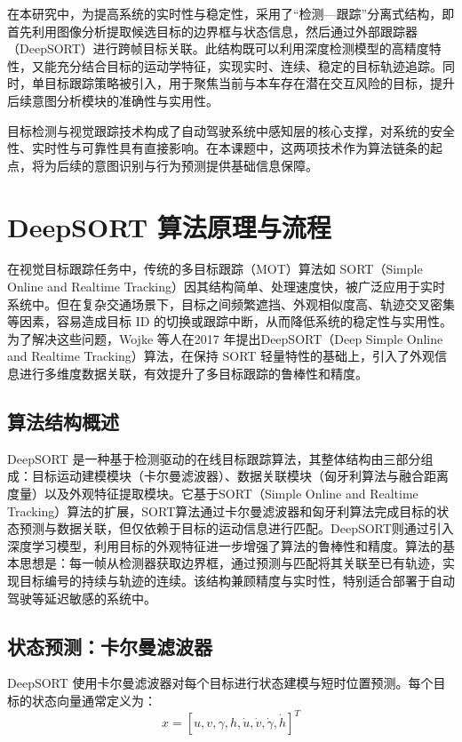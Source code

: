 在本研究中，为提高系统的实时性与稳定性，采用了“检测—跟踪”分离式结构，即首先利用图像分析提取候选目标的边界框与状态信息，然后通过外部跟踪器（DeepSORT）进行跨帧目标关联。此结构既可以利用深度检测模型的高精度特性，又能充分结合目标的运动学特征，实现实时、连续、稳定的目标轨迹追踪。同时，单目标跟踪策略被引入，用于聚焦当前与本车存在潜在交互风险的目标，提升后续意图分析模块的准确性与实用性。

目标检测与视觉跟踪技术构成了自动驾驶系统中感知层的核心支撑，对系统的安全性、实时性与可靠性具有直接影响。在本课题中，这两项技术作为算法链条的起点，将为后续的意图识别与行为预测提供基础信息保障。


\section{DeepSORT 算法原理与流程}

在视觉目标跟踪任务中，传统的多目标跟踪（MOT）算法如 SORT（Simple Online and Realtime Tracking）因其结构简单、处理速度快，被广泛应用于实时系统中。但在复杂交通场景下，目标之间频繁遮挡、外观相似度高、轨迹交叉密集等因素，容易造成目标 ID 的切换或跟踪中断，从而降低系统的稳定性与实用性。为了解决这些问题，Wojke 等人\cite{Wojke2017DeepSORT}在2017 年提出DeepSORT（Deep Simple Online and Realtime Tracking）算法，在保持 SORT 轻量特性的基础上，引入了外观信息进行多维度数据关联，有效提升了多目标跟踪的鲁棒性和精度。

\subsection{算法结构概述}

DeepSORT 是一种基于检测驱动的在线目标跟踪算法，其整体结构由三部分组成：目标运动建模模块（卡尔曼滤波器）、数据关联模块（匈牙利算法与融合距离度量）以及外观特征提取模块。它基于SORT（Simple Online and Realtime Tracking）算法的扩展，SORT算法通过卡尔曼滤波器和匈牙利算法完成目标的状态预测与数据关联，但仅依赖于目标的运动信息进行匹配。DeepSORT则通过引入深度学习模型，利用目标的外观特征进一步增强了算法的鲁棒性和精度。算法的基本思想是：每一帧从检测器获取边界框，通过预测与匹配将其关联至已有轨迹，实现目标编号的持续与轨迹的连续。该结构兼顾精度与实时性，特别适合部署于自动驾驶等延迟敏感的系统中。

\subsection{状态预测：卡尔曼滤波器}

DeepSORT 使用卡尔曼滤波器对每个目标进行状态建模与短时位置预测。每个目标的状态向量通常定义为：
\[x = [u, v, \gamma, h, \dot{u}, \dot{v}, \dot{\gamma}, \dot{h}]^{T}\]

